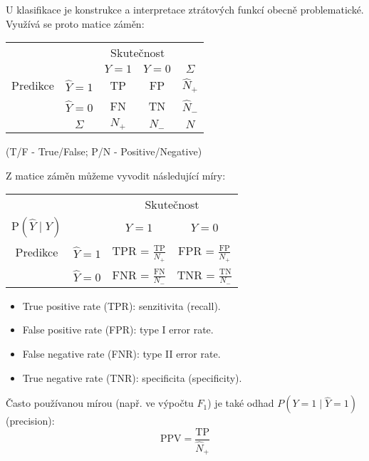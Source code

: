 U klasifikace je konstrukce a interpretace ztrátových funkcí obecně problematické. Využívá se proto matice záměn:
{\def\arraystretch{1.5}
\begin{center}
    \begin{tabular}{ c c | c c | c }
                 &               & \multicolumn{2}{c|}{Skutečnost}                       \\
                 &               & $Y = 1$                         & $Y=0$ & $\Sigma$    \\
        \hline
        Predikce & $\hat{Y} = 1$ & TP                              & FP    & $\hat{N}_+$ \\
                 & $\hat{Y} = 0$ & FN                              & TN    & $\hat{N}_-$ \\
        \hline
                 & $\Sigma$      & $N_+$                           & $N_-$ & $N$
    \end{tabular}
\end{center}}
(T/F - True/False; P/N - Positive/Negative)

Z matice záměn můžeme vyvodit následující míry:
{\def\arraystretch{2}
\begin{center}
    \begin{tabular}{ c c | c c }
                                   &               & \multicolumn{2}{c}{Skutečnost}                                 \\
        $\text{P}(\hat{Y} \mid Y)$ &               & $Y = 1$                        & $Y=0$                         \\
        \hline
        Predikce                   & $\hat{Y} = 1$ & TPR = $\frac{\text{TP}}{N_+}$  & FPR = $\frac{\text{FP}}{N_+}$ \\
                                   & $\hat{Y} = 0$ & FNR = $\frac{\text{FN}}{N_-}$  & TNR = $\frac{\text{TN}}{N_-}$ \\
    \end{tabular}
\end{center}}
\begin{itemize}
    \item True positive rate (TPR): senzitivita (recall).
    \item False positive rate (FPR): type I error rate.
    \item False negative rate (FNR): type II error rate.
    \item True negative rate (TNR): specificita (specificity).
\end{itemize}
Často používanou mírou (např. ve výpočtu $F_1$) je také odhad $P(Y = 1 \mid \hat{Y} = 1)$ (precision):
\[\text{PPV} = \frac{\text{TP}}{\hat{N}_+}\]

